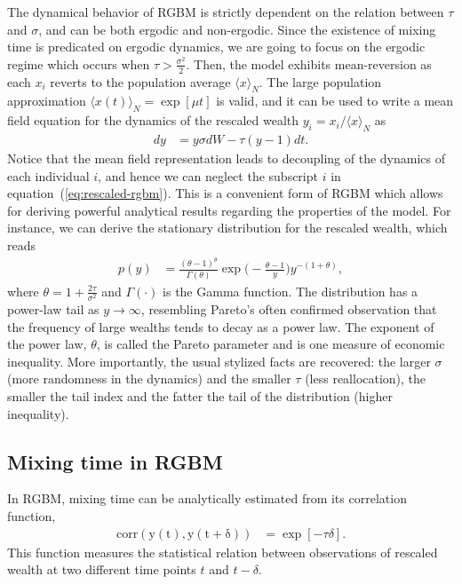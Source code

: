 \documentclass[11pt]{article}
\numberwithin{equation}{section}
\begin{document}
The dynamical behavior of RGBM is strictly dependent on the relation between $\tau$ and $\sigma$, and can be both ergodic and non-ergodic. Since the existence of mixing time is predicated on ergodic dynamics, we are going to focus on the ergodic regime which occurs when $\tau > \frac{\sigma^2}{2}$. Then, the model exhibits mean-reversion as each $x_i$ reverts to the population average $\langle x \rangle_N$. The large population approximation $\langle x(t) \rangle_N = \exp \left[\mu t\right]$ is valid, and it can be used to write a mean field equation for the dynamics of the rescaled wealth $y_i = x_i / \langle x \rangle_N$ as
\begin{align}
    d y &=   y \sigma d W - \tau (y - 1) dt.
    \label{eq:rescaled-rgbm}
\end{align}
Notice that the mean field representation leads to decoupling of the dynamics of each individual $i$, and hence we can neglect the subscript $i$ in equation~(\ref{eq:rescaled-rgbm}). This is a convenient form of RGBM which allows for deriving powerful analytical results regarding the properties of the model. For instance, we can derive the stationary distribution for the rescaled wealth, which reads
\begin{align}
    p(y) &= \frac{(\theta - 1)^{\theta}}{\Gamma(\theta)} \exp{\big(-\frac{\theta - 1}{y}\big)} y^{-(1+\theta)},
    \label{eq:rgbm-stationary-distribution}
\end{align}
where $\theta = 1 + \frac{2 \tau}{\sigma^2}$ and $\Gamma(\cdot)$ is the Gamma function.  The distribution has a power-law tail as $y \to \infty$,
resembling Pareto’s often confirmed observation that the frequency of large wealths tends to decay
as a power law. The exponent of the power law, $\theta$, is called the Pareto parameter and is one
measure of economic inequality. More importantly, the usual stylized facts are recovered: the larger $\sigma$ (more randomness in the dynamics) and the smaller $\tau$ (less reallocation), the smaller the tail index and the fatter the tail of the distribution (higher inequality).

\subsection{Mixing time in RGBM}

In RGBM, mixing time can be analytically estimated from its correlation function,
\begin{align}
    \mathrm{corr(y(t), y(t+\delta))} &= \exp\left[ -\tau \delta \right].
    \label{eq:rgbm-correlation}
\end{align}
This function measures the statistical relation between observations of rescaled wealth at two different time points $t$ and $t-\delta$. 
\end{document}
